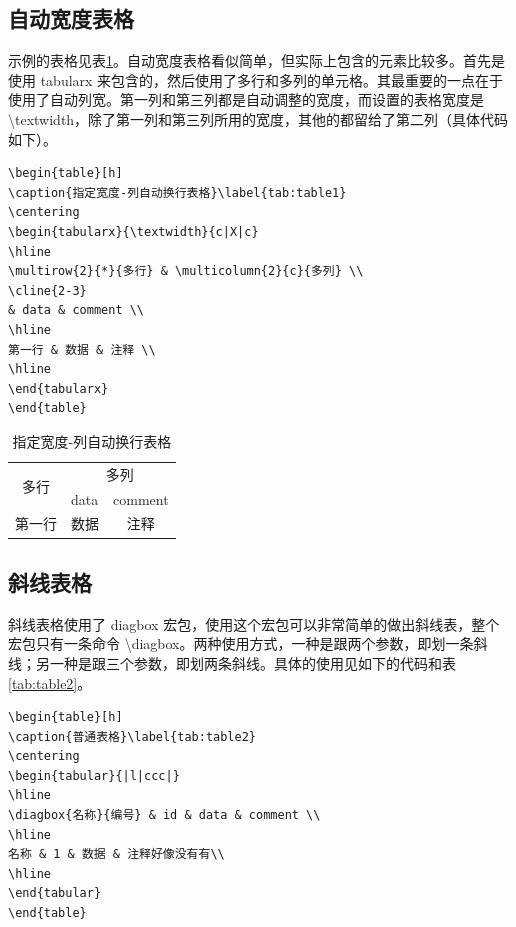 \documentclass[a4paper,oneside,cs4size,fancyhdr]{ctexart}
\begin{document}
\subsection{自动宽度表格}
示例的表格见表\ref{tab:table1}。自动宽度表格看似简单，但实际上包含的元素比较多。首先是使用 tabularx 来包含的，然后使用了多行和多列的单元格。其最重要的一点在于使用了自动列宽。第一列和第三列都是自动调整的宽度，而设置的表格宽度是 \textbackslash{}textwidth，除了第一列和第三列所用的宽度，其他的都留给了第二列（具体代码如下）。

\begin{verbatim}
\begin{table}[h]
\caption{指定宽度-列自动换行表格}\label{tab:table1}
\centering
\begin{tabularx}{\textwidth}{c|X|c}
\hline
\multirow{2}{*}{多行} & \multicolumn{2}{c}{多列} \\
\cline{2-3}
& data & comment \\
\hline
第一行 & 数据 & 注释 \\
\hline
\end{tabularx}
\end{table}
\end{verbatim}

\begin{table}[h]
\caption{指定宽度-列自动换行表格}\label{tab:table1}
\centering
\begin{tabularx}{\textwidth}{c|X|c}
\hline
\multirow{2}{*}{多行} & \multicolumn{2}{c}{多列} \\
\cline{2-3}
& data & comment \\
\hline
第一行 & 数据 & 注释 \\
\hline
\end{tabularx}
\end{table}

\subsection{斜线表格}
斜线表格使用了 diagbox 宏包，使用这个宏包可以非常简单的做出斜线表，整个宏包只有一条命令 \textbackslash{}diagbox。两种使用方式，一种是跟两个参数，即划一条斜线；另一种是跟三个参数，即划两条斜线。具体的使用见如下的代码和表\ref{tab:table2}。

\begin{verbatim}
\begin{table}[h]
\caption{普通表格}\label{tab:table2}
\centering
\begin{tabular}{|l|ccc|}
\hline
\diagbox{名称}{编号} & id & data & comment \\
\hline
名称 & 1 & 数据 & 注释好像没有有\\
\hline
\end{tabular}
\end{table}
\end{verbatim}
\end{document}
